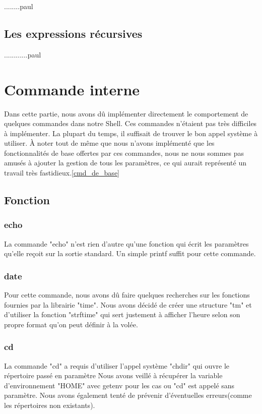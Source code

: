 \documentclass[12pt]{article}
\begin{document}
........paul


\subsection{Les expressions récursives}

............paul

\newpage
\section{Commande interne}

Dans cette partie, nous avons dû implémenter directement le comportement de quelques
commandes dans notre Shell. Ces commandes n'étaient pas très difficiles à implémenter. La plupart
du temps, il suffisait de trouver le bon appel système à utiliser. À noter tout de même
que nous n'avons implémenté que les fonctionnalités de base offertes par ces commandes, nous
ne nous sommes pas amusés à ajouter la gestion de tous les paramètres, ce qui aurait 
représenté un travail très fastidieux.\ref{cmd_de_base}

\subsection{Fonction}
\subsubsection{echo}
 La commande "echo" n'est rien d'autre qu'une fonction qui écrit les paramètres qu'elle reçoit
 sur la sortie standard. Un simple printf suffit pour cette commande.
 
\subsubsection{date}
 Pour cette commande, nous avons dû faire quelques recherches sur les fonctions fournies par la librairie "time".
 Nous avons décidé de créer une structure "tm" et d'utiliser la fonction "strftime" qui
 sert justement à afficher l'heure selon son propre format qu'on peut définir à la volée.
 
 \subsubsection{cd}
 La commande "cd" a requis d'utiliser l'appel système "chdir" qui ouvre le répertoire passé en paramètre
 Nous avons veillé à récupérer la variable d'environnement "HOME" avec getenv pour les cas ou "cd" est
 appelé sans paramètre. Nous avons également tenté de prévenir d'éventuelles erreurs(comme les
 répertoires non existants).
 
\end{document}

